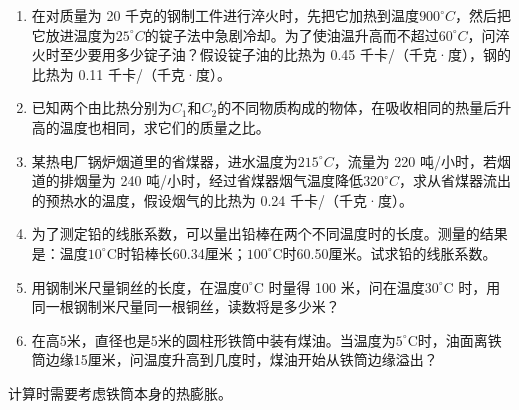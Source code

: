 \begin{enumerate}
\def\labelenumi{\arabic{enumi}.}
\setcounter{enumi}{18}
\item
  在对质量为 20
  千克的钢制工件进行淬火时，先把它加热到温度\(900^{\circ}C\)，然后把它放进温度为\(25^{\circ}C\)的锭子法中急剧冷却。为了使油温升高而不超过\(60^{\circ}C\)，问淬火时至少要用多少锭子油？假设锭子油的比热为
  0.45 千卡/（千克·度），钢的比热为 0.11 千卡/（千克·度）。
\item
  已知两个由比热分别为\(C_1\)和\(C_2\)的不同物质构成的物体，在吸收相同的热量后升高的温度也相同，求它们的质量之比。
\item
  某热电厂锅炉烟道里的省煤器，进水温度为\(215^{\circ}C\)，流量为 220
  吨/小时，若烟道的排烟量为 240
  吨/小时，经过省煤器烟气温度降低\(320^{\circ}C\)，求从省煤器流出的预热水的温度，假设烟气的比热为
  0.24 千卡/（千克·度）。
\item
  为了测定铅的线胀系数，可以量出铅棒在两个不同温度时的长度。测量的结果是：温度\(10^{\circ} \mathrm{C}\)时铅棒长60.34厘米；\(100^{\circ} \mathrm{C}\)时60.50厘米。试求铅的线胀系数。
\item
  用钢制米尺量铜丝的长度，在温度\(0^{\circ}\)C 时量得 100
  米，问在温度\(30^{\circ}\)C
  时，用同一根钢制米尺量同一根铜丝，读数将是多少米？
\item
  在高5米，直径也是5米的圆柱形铁筒中装有煤油。当温度为\(5^{\circ} \mathrm{C}\)时，油面离铁筒边缘15厘米，问温度升高到几度时，煤油开始从铁筒边缘溢出？
\end{enumerate}

计算时需要考虑铁筒本身的热膨胀。

